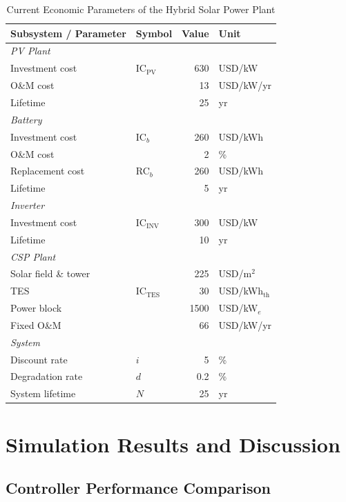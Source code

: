 \documentclass[journal]{IEEEtran}
\begin{document}
\begin{table}[!t]
\centering
\caption{Current Economic Parameters of the Hybrid Solar Power Plant}
\label{tab:econ_current}
\begin{tabular}{llrl}
\toprule
\textbf{Subsystem / Parameter} & \textbf{Symbol} & \textbf{Value} & \textbf{Unit} \\
\midrule
\multicolumn{4}{l}{\textit{PV Plant}} \\
Investment cost & IC$_{\text{PV}}$ & 630 & USD/kW \\
O\&M cost & & 13 & USD/kW/yr \\
Lifetime & & 25 & yr \\
\midrule
\multicolumn{4}{l}{\textit{Battery}} \\
Investment cost & IC$_b$ & 260 & USD/kWh \\
O\&M cost & & 2 & \% \\
Replacement cost & RC$_b$ & 260 & USD/kWh \\
Lifetime & & 5 & yr \\
\midrule
\multicolumn{4}{l}{\textit{Inverter}} \\
Investment cost & IC$_{\text{INV}}$ & 300 & USD/kW \\
Lifetime & & 10 & yr \\
\midrule
\multicolumn{4}{l}{\textit{CSP Plant}} \\
Solar field \& tower & & 225 & USD/m$^2$ \\
TES & IC$_{\text{TES}}$ & 30 & USD/kWh$_{\text{th}}$ \\
Power block & & 1500 & USD/kW$_e$ \\
Fixed O\&M & & 66 & USD/kW/yr \\
\midrule
\multicolumn{4}{l}{\textit{System}} \\
Discount rate & $i$ & 5 & \% \\
Degradation rate & $d$ & 0.2 & \% \\
System lifetime & $N$ & 25 & yr \\
\bottomrule
\end{tabular}
\end{table}

\section{Simulation Results and Discussion}
\label{sec:results}

\subsection{Controller Performance Comparison}
\end{document}
